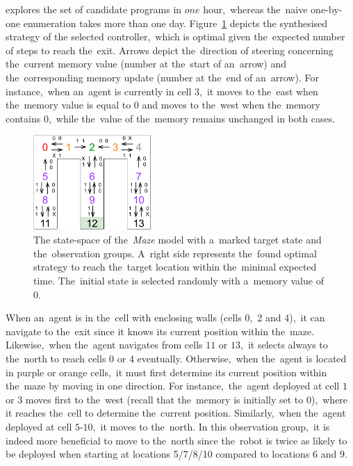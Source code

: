 \toolname{} explores the set of candidate programs in $one$ hour,~whereas the~naive one-by-one enumeration takes more than one day.
Figure~\ref{fig:maze} depicts the synthesised strategy of the selected controller,~which is optimal given the~expected number of steps to reach the~exit.
Arrows depict the~direction of steering concerning the~current memory value (number at the~start of an~arrow) and the~corresponding memory update (number at the~end of an~arrow).
For instance,~when an~agent is currently in cell $3$,~it moves to the~east when the~memory value is equal to $0$ and moves to the~west when the~memory contains 0,~while the~value of the~memory remains unchanged in both cases.

\begin{figure}[h!]
\centering
\includegraphics[width=0.4\textwidth]{figures/maze.pdf}
\caption{The state-space of the~\textit{Maze} model with a~marked target state and the~observation groups. A~right side represents the~found optimal strategy to reach the~target location within the~minimal expected time. The~initial state is selected randomly with a~memory value of 0.}%
\label{fig:maze}%
\end{figure}

When an~agent is in the~cell with enclosing walls (cells 0,~2 and 4),~it can navigate to the~exit since it knows its current position within the~maze.
Likewise,~when the~agent navigates from cells $11$ or $13$,~it selects always to the~north to reach cells $0$ or $4$ eventually.
Otherwise,~when the~agent is located in purple or orange cells,~it must first determine its current position within the~maze by moving in one direction.
For instance,~the~agent deployed at cell $1$ or $3$ moves first to the~west (recall that the~memory is initially set to 0),~where it reaches the~cell to determine the~current position.
Similarly,~when the~agent deployed at cell $5$-$10$,~it moves to the~north.
In this observation group,~it is indeed more beneficial to move to the~north since the~robot is twice as likely to be deployed when starting at locations 5/7/8/10 compared to locations 6 and 9.

